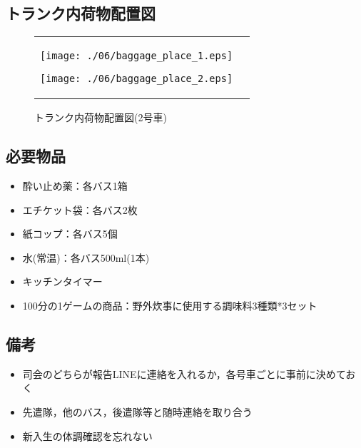 \subsection{トランク内荷物配置図}
\begin{figure}[H]
  \begin{tabular}{lr}
    \begin{minipage}{0.5\textwidth}
  \begin{center}
  \texttt{[image: ./06/baggage\_place\_1.eps]}
  \caption{トランク内荷物配置図(1号車)}
\end{center}
\end{minipage}

\begin{minipage}{0.5\textwidth}
\begin{center}
  \texttt{[image: ./06/baggage\_place\_2.eps]}
  \caption{トランク内荷物配置図(2号車)}
\end{center}
\end{minipage}
\end{tabular}
\end{figure}


\subsection{必要物品}
\begin{itemize}
\item 酔い止め薬：各バス1箱
\item エチケット袋：各バス2枚
\item 紙コップ：各バス5個
\item 水(常温)：各バス500ml(1本)
\item キッチンタイマー
\item 100分の1ゲームの商品：野外炊事に使用する調味料3種類*3セット
\end{itemize}

\subsection{備考}

\begin{itemize}
\item 司会のどちらが報告LINEに連絡を入れるか，各号車ごとに事前に決めておく
\item 先遣隊，他のバス，後遣隊等と随時連絡を取り合う
\item 新入生の体調確認を忘れない
\end{itemize}


